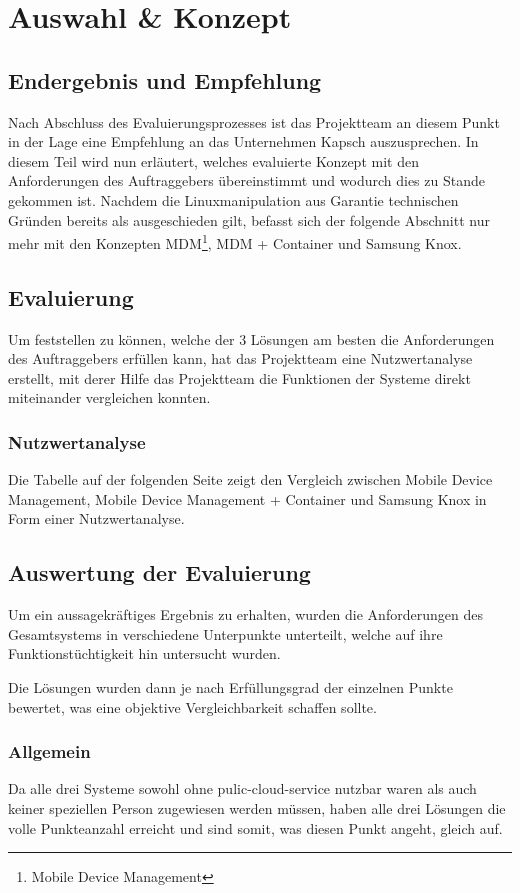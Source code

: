 \chapter{Auswahl \& Konzept}
\section{Endergebnis und Empfehlung}
Nach Abschluss des Evaluierungsprozesses ist das Projektteam an diesem Punkt in der Lage eine Empfehlung an das Unternehmen Kapsch auszusprechen. In diesem Teil wird nun erläutert, welches evaluierte Konzept mit den Anforderungen des Auftraggebers übereinstimmt und wodurch dies zu Stande gekommen ist. Nachdem die Linuxmanipulation aus Garantie technischen Gründen bereits als ausgeschieden gilt, befasst sich der folgende Abschnitt nur mehr mit den Konzepten MDM\footnote{Mobile Device Management}, MDM + Container und Samsung Knox.
\section{Evaluierung}
Um feststellen zu können, welche der 3 Lösungen am besten die Anforderungen des Auftraggebers erfüllen kann, hat das Projektteam eine Nutzwertanalyse erstellt, mit derer Hilfe das Projektteam die Funktionen der Systeme direkt miteinander vergleichen konnten.
\subsection{Nutzwertanalyse}
Die Tabelle auf der folgenden Seite zeigt den Vergleich zwischen Mobile Device Management, Mobile Device Management + Container und Samsung Knox in Form einer Nutzwertanalyse.



\section{Auswertung der Evaluierung}
Um ein aussagekräftiges Ergebnis zu erhalten, wurden die Anforderungen des Gesamtsystems in verschiedene Unterpunkte unterteilt, welche auf ihre Funktionstüchtigkeit hin untersucht wurden. \par
Die Lösungen wurden dann je nach Erfüllungsgrad der einzelnen Punkte bewertet, was eine objektive Vergleichbarkeit schaffen sollte.
\subsection{Allgemein}
Da alle drei Systeme sowohl ohne pulic-cloud-service nutzbar waren als auch keiner speziellen Person zugewiesen werden müssen, haben alle drei Lösungen die volle Punkteanzahl erreicht und sind somit, was diesen Punkt angeht, gleich auf.
